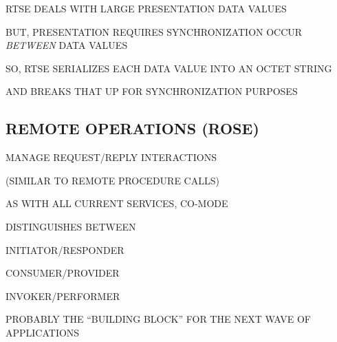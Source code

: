 \begin{bwslide}

\begin{nrtc}
\item	RTSE DEALS WITH LARGE PRESENTATION DATA VALUES

\item	BUT, PRESENTATION REQUIRES SYNCHRONIZATION OCCUR \emph{BETWEEN} DATA
	VALUES

\item	SO, RTSE SERIALIZES EACH DATA VALUE INTO AN OCTET STRING
    \begin{nrtc}
    \item	AND BREAKS THAT UP FOR SYNCHRONIZATION PURPOSES
    \end{nrtc}
\end{nrtc}
\end{bwslide}


\begin{bwslide}
\part*	{REMOTE OPERATIONS (ROSE)}\bf

\begin{nrtc}
\item	MANAGE REQUEST/REPLY INTERACTIONS
    \begin{nrtc}
    \item	(SIMILAR TO REMOTE PROCEDURE CALLS)
    \end{nrtc}

\item	AS WITH ALL CURRENT SERVICES, CO-MODE

\item	DISTINGUISHES BETWEEN
    \begin{nrtc}
    \item	INITIATOR/RESPONDER

    \item	CONSUMER/PROVIDER

    \item	INVOKER/PERFORMER
    \end{nrtc}
\item	PROBABLY THE ``BUILDING BLOCK'' FOR THE NEXT WAVE OF APPLICATIONS
\end{nrtc}
\end{bwslide}


